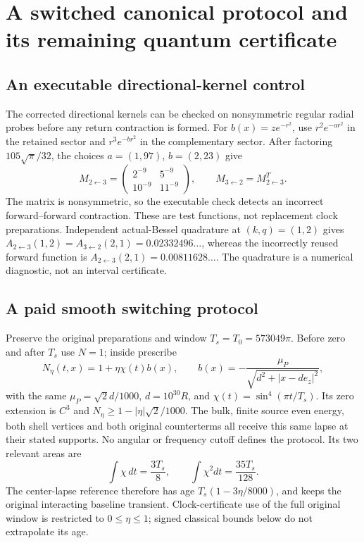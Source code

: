 \section{A switched canonical protocol and its remaining quantum certificate}
\label{sec:canonical-switched-update}
\subsection{An executable directional-kernel control}
The corrected directional kernels can be checked on nonsymmetric regular
radial probes before any return contraction is formed. For
$b(x)=ze^{-r^2}$, use $r^2e^{-ar^2}$ in the retained sector and
$r^3e^{-br^2}$ in the complementary sector. After factoring
$105\sqrt\pi/32$, the choices $a=(1,97)$, $b=(2,23)$ give
\[
 M_{2\leftarrow3}=\begin{pmatrix}2^{-9}&5^{-9}\\10^{-9}&11^{-9}\end{pmatrix},
 \qquad M_{3\leftarrow2}=M_{2\leftarrow3}^{T}.
\]
The matrix is nonsymmetric, so the executable check detects an incorrect
forward--forward contraction. These are test functions, not replacement
clock preparations. Independent actual-Bessel quadrature at $(k,q)=(1,2)$
gives $A_{2\leftarrow3}(1,2)=A_{3\leftarrow2}(2,1)
=0.02332496\ldots$, whereas the incorrectly reused forward function is
$A_{2\leftarrow3}(2,1)=0.00811628\ldots$.
The quadrature is a numerical diagnostic, not an interval certificate.

\subsection{A paid smooth switching protocol}
Preserve the original preparations and window $T_s=T_0=573049\pi$.
Before zero and after $T_s$ use $N=1$; inside prescribe
\[
 N_\eta(t,x)=1+\eta\chi(t)b(x),\qquad
 b(x)=-\frac{\mu_P}{\sqrt{d^2+|x-de_z|^2}},
\]
with the same $\mu_P=\sqrt2d/1000$, $d=10^{30}R$, and
$\chi(t)=\sin^4(\pi t/T_s)$.  Its zero extension is $C^3$ and
$N_\eta\ge1-|\eta|\sqrt2/1000$.  The bulk, finite source even energy,
both shell vertices and both original counterterms all receive this same
lapse at their stated supports.  No angular or frequency cutoff defines
the protocol. Its two relevant areas are
\[
 \int\chi\,dt=\frac{3T_s}{8},\qquad
 \int\chi^2dt=\frac{35T_s}{128}.
\]
The center-lapse reference therefore has age $T_s(1-3\eta/8000)$,
and keeps the original interacting baseline transient.
Clock-certificate use of the full original window is restricted to
$0\le\eta\le1$; signed classical bounds below do not extrapolate its age.

